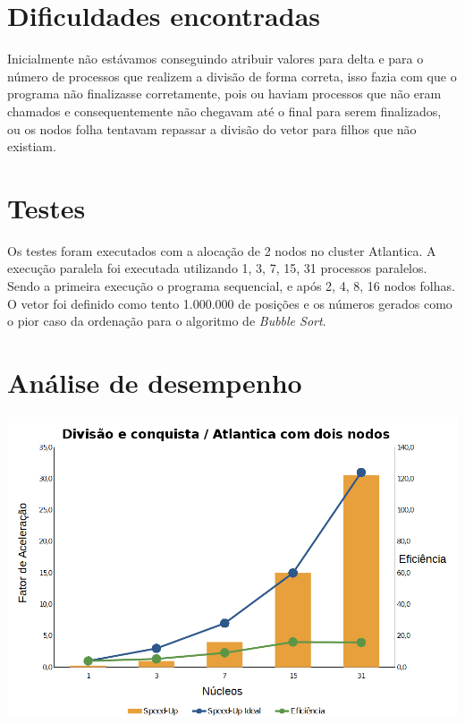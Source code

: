\documentclass[12pt]{article}
\newenvironment{Figure}
  {\par\medskip\noindent\minipage{\linewidth}}
  {\endminipage\par\medskip}
\begin{document}
{\begin{multicols}{2}
\section{Dificuldades encontradas}
Inicialmente não estávamos conseguindo atribuir valores para delta e para o número de processos que realizem a divisão de forma correta, isso fazia com que o programa não finalizasse corretamente, pois ou haviam processos que não eram chamados e consequentemente não chegavam até o final para serem finalizados, ou os nodos folha tentavam repassar a divisão do vetor para filhos que não existiam.

\section{Testes}
Os testes foram executados com a alocação de 2 nodos no cluster Atlantica. A execução paralela foi executada utilizando 1, 3, 7, 15, 31 processos paralelos. Sendo a primeira execução o programa sequencial, e após 2, 4, 8, 16 nodos folhas. O vetor foi definido como tento 1.000.000 de posições e os números gerados como o pior caso da ordenação para o algoritmo de \textit{Bubble Sort}.

\section{Análise de desempenho}

\begin{Figure}
\centering
\includegraphics[width=\columnwidth]{fig/grafico.png}
\label{fig:grafico}
\end{Figure}

\end{multicols}}
\end{document}
